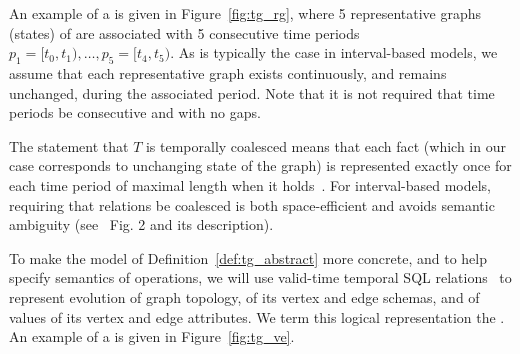 An example of a \tg is given in Figure~\ref{fig:tg_rg}, where 5
representative graphs (states) of  are associated with 5
consecutive time periods $p_1=[t_0,t_1), \ldots, p_5=[t_4,t_5)$.  
%
As is typically the case in interval-based models, we assume that each
representative graph exists continuously, and remains unchanged,
during the associated period.  Note that it is not required that time
periods be consecutive and with no gaps.

The statement that $T$ is temporally coalesced means that each fact
(which in our case corresponds to unchanging state of the graph) is
represented exactly once for each time period of maximal length when
it holds~\cite{DBLP:conf/vldb/BohlenSS96}.  For interval-based models,
requiring that relations be coalesced is both space-efficient and
avoids semantic ambiguity (see~\cite{DBLP:reference/db/JensenS09k}
Fig. 2 and its description).

To make the model of Definition~\ref{def:tg_abstract} more concrete,
and to help specify semantics of \tg operations, we will use
valid-time temporal SQL relations~\cite{DBLP:conf/vldb/BohlenSS96} to
represent evolution of graph topology, of its vertex and edge schemas,
and of values of its vertex and edge attributes.  We term this logical
representation the {\em \ve \tg}.  An example of a \ve \tg is given in
Figure~\ref{fig:tg_ve}.



